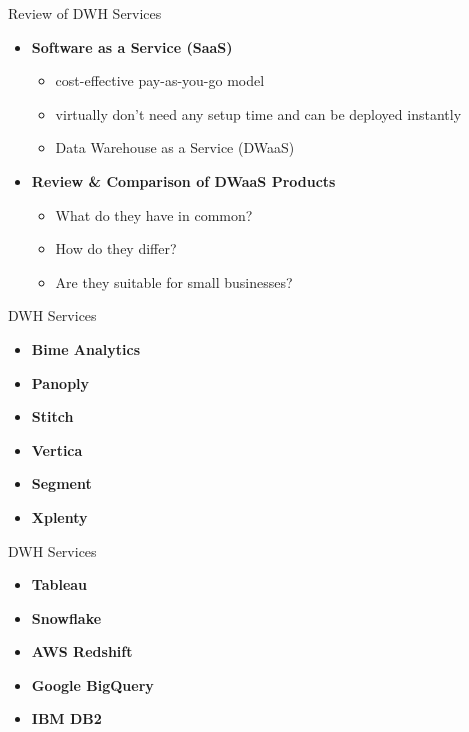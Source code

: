 \documentclass[aspectratio=169]{beamer}
\begin{document}
  \begin{frame}{Review of DWH Services}
    \begin{itemize}
      \item \textbf{Software as a Service (SaaS)}
      	\begin{itemize}
      	   \item cost-effective pay-as-you-go model
           \item virtually don't need any setup time and can be deployed instantly
      	   \item Data Warehouse as a Service (DWaaS)
      	\end{itemize}
      \item \textbf{Review \& Comparison of DWaaS Products}
        \begin{itemize}
           \item What do they have in common?
      	   \item How do they differ?
      	   \item Are they suitable for small businesses?
      	\end{itemize}
    \end{itemize}
  \end{frame}

  \begin{frame}{DWH Services}
    \begin{itemize}
      \item \textbf{Bime Analytics}
      \item \textbf{Panoply}
      \item \textbf{Stitch}
      \item \textbf{Vertica}
      \item \textbf{Segment}
      \item \textbf{Xplenty}
    \end{itemize}
  \end{frame}

  \begin{frame}{DWH Services}
    \begin{itemize}
      \item \textbf{Tableau}
      \item \textbf{Snowflake}
      \item \textbf{AWS Redshift}
      \item \textbf{Google BigQuery}
      \item \textbf{IBM DB2}
    \end{itemize}
  \end{frame}
\end{document}
